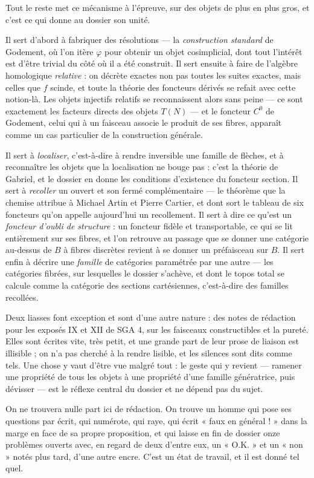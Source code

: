 \documentclass[11pt,a4paper]{article}
\begin{document}
\begin{resume}
Tout le reste met ce mécanisme à l'épreuve, sur des objets de plus en plus
gros, et c'est ce qui donne au dossier son unité.

Il sert d'abord à fabriquer des résolutions — la \emph{construction standard}
de Godement, où l'on itère $\varphi$ pour obtenir un objet cosimplicial, dont
tout l'intérêt est d'être trivial du côté où il a été construit. Il sert
ensuite à faire de l'algèbre homologique \emph{relative} : on décrète exactes
non pas toutes les suites exactes, mais celles que $f$ scinde, et toute la
théorie des foncteurs dérivés se refait avec cette notion-là. Les objets
injectifs relatifs se reconnaissent alors sans peine — ce sont exactement les
facteurs directs des objets $T(N)$ — et le foncteur $C^{0}$ de Godement, celui
qui à un faisceau associe le produit de ses fibres, apparaît comme un cas
particulier de la construction générale.

Il sert à \emph{localiser}, c'est-à-dire à rendre inversible une famille de
flèches, et à reconnaître les objets que la localisation ne bouge pas : c'est
la théorie de Gabriel, et le dossier en donne les conditions d'existence du
foncteur section. Il sert à \emph{recoller} un ouvert et son fermé
complémentaire — le théorème que la chemise attribue à Michael Artin et Pierre
Cartier, et dont sort le tableau de six foncteurs qu'on appelle aujourd'hui un
recollement. Il sert à dire ce qu'est un \emph{foncteur d'oubli de structure} :
un foncteur fidèle et transportable, ce qui se lit entièrement sur ses fibres,
et l'on retrouve au passage que se donner une catégorie au-dessus de $B$ à
fibres discrètes revient à se donner un préfaisceau sur $B$. Il sert enfin à
décrire une \emph{famille} de catégories paramétrée par une autre — les
catégories fibrées, sur lesquelles le dossier s'achève, et dont le topos total
se calcule comme la catégorie des sections cartésiennes, c'est-à-dire des
familles recollées.

Deux liasses font exception et sont d'une autre nature : des notes de rédaction
pour les exposés IX et XII de SGA 4, sur les faisceaux constructibles et la
pureté. Elles sont écrites vite, très petit, et une grande part de leur prose
de liaison est illisible ; on n'a pas cherché à la rendre lisible, et les
silences sont dits comme tels. Une chose y vaut d'être vue malgré tout : le
geste qui y revient — ramener une propriété de tous les objets à une propriété
d'une famille génératrice, puis dévisser — est le réflexe central du dossier et
ne dépend pas du sujet.

On ne trouvera nulle part ici de rédaction. On trouve un homme qui pose ses
questions par écrit, qui numérote, qui raye, qui écrit « faux en général ! »
dans la marge en face de sa propre proposition, et qui laisse en fin de dossier
onze problèmes ouverts avec, en regard de deux d'entre eux, un « O.K. » et un
« non » notés plus tard, d'une autre encre. C'est un état de travail, et il est
donné tel quel.


\end{resume}
\end{document}
